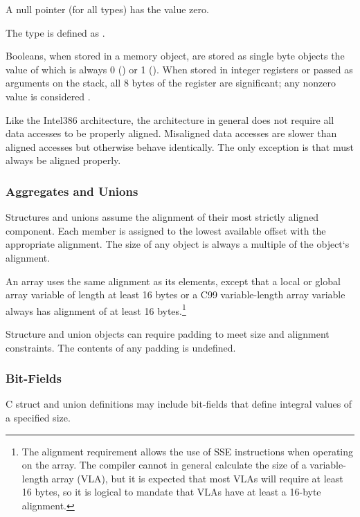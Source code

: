 A null pointer (for all types) has the value zero.

The type  is defined as .

Booleans, when stored in a memory object, are stored as
single byte objects the value of which is always 0 () or 1
().  When stored in integer registers or passed as
arguments on the stack, all 8 bytes of the register are significant;
any nonzero value is considered .

Like the Intel386 architecture, the \xARCH architecture in general
does not require all data accesses to be properly aligned.  Misaligned
data accesses are slower than aligned accesses
but otherwise behave identically.  The only exception is that
 must always be aligned properly.

\subsubsection{Aggregates and Unions}

Structures and unions assume the alignment of their most strictly
aligned component.  Each member is assigned to the lowest available
offset with the appropriate alignment.  The size of any object is always
a multiple of the object`s alignment.

An array uses the same alignment as its elements, except that a local
or global array variable of length at least 16 bytes or a C99
variable-length array variable always has alignment
of at least 16 bytes.\footnote{The alignment requirement allows the
  use of SSE instructions when operating on the array.  The compiler
  cannot in general calculate the size of a variable-length array (VLA), but
  it is expected that most VLAs will require at least 16 bytes, so it
  is logical to mandate that VLAs have at least a 16-byte alignment.}

Structure and union objects can require padding to meet size and
alignment constraints.  The contents of any padding is undefined.


\subsubsection{Bit-Fields}

C struct and union definitions may include bit-fields that define
integral values of a specified size.

